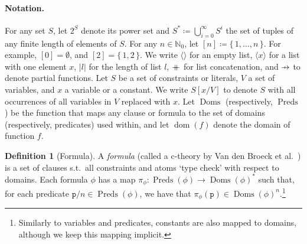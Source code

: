 \documentclass{article}
\theoremstyle{definition}
\newtheorem{definition}{Definition}
\newcommand\pfun{\mathrel{\ooalign{\hfil$\mapstochar\mkern5mu$\hfil\cr$\to$\cr}}}
\newcommand\mdoubleplus{\mathbin{+\mkern-10mu+}}
\DeclareMathOperator{\dom}{dom}
\DeclareMathOperator{\Doms}{Doms}
\DeclareMathOperator{\Preds}{Preds}
\begin{document}
\paragraph{Notation.}
For any set $S$, let $2^{S}$ denote its power set and
$S^{\ast} \coloneqq \bigcup_{i=0}^{\infty} S^{i}$ the set of tuples of any
finite length of elements of $S$. For any $n \in \mathbb{N}_{0}$, let
$[n] \coloneqq \{\, 1, \dots, n \,\}$. For example, $[0] = \emptyset$, and
$[2] = \{\, 1, 2 \,\}$. We write $\langle\rangle$ for an empty list,
$\langle x \rangle$ for a list with one element $x$, $|l|$ for the length of
list $l$, $\mdoubleplus$ for list concatenation, and $\pfun$ to denote partial
functions. Let $S$ be a set of constraints or literals, $V$ a set of variables,
and $x$ a variable or a constant. We write $S[x/V]$ to denote $S$ with all
occurrences of all variables in $V$ replaced with $x$. Let $\Doms$
(respectively, $\Preds$) be the function that maps any clause or formula to the
set of domains (respectively, predicates) used within, and let $\dom(f)$ denote
the domain of function $f$.

\begin{definition}[Formula]\label{def:formula}
  A \emph{formula} (called a c-theory by Van den Broeck et
  al.~) is a set of clauses s.t.\ all
  constraints and atoms `type check' with respect to domains. Each formula
  $\phi$ has a map $\pi_{\phi}\colon \Preds(\phi) \to {\Doms(\phi)}^{\ast}$ such
  that, for each predicate $\texttt{p}/n \in \Preds(\phi)$, we have that
  $\pi_{\phi}(\texttt{p}) \in {\Doms(\phi)}^{n}$.\footnote{Similarly to
    variables and predicates, constants are also mapped to domains, although we
    keep this mapping implicit.}
\end{definition}
\end{document}
